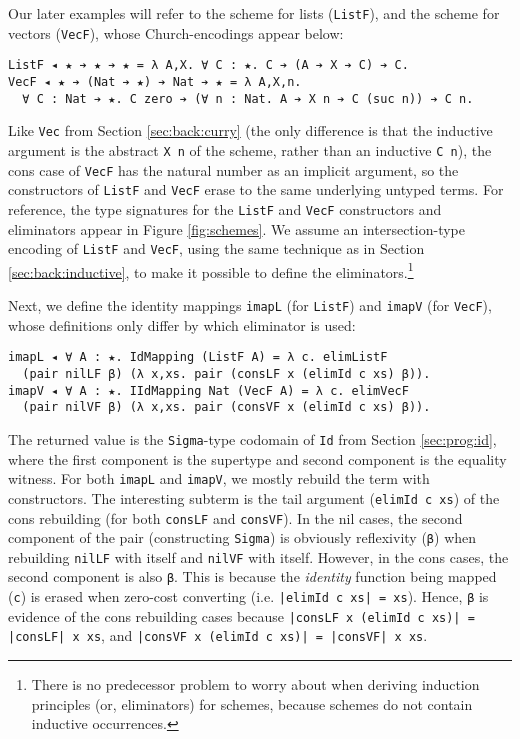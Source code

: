 \documentclass[acmsmall,screen]{acmart}
\newcommand{\refsec}[1]{Section \ref{sec:#1}}
\newcommand{\reffig}[1]{Figure \ref{fig:#1}}
\begin{document}
Our later examples will refer to the scheme for lists (\verb;ListF;),
and the scheme for vectors (\verb;VecF;), whose Church-encodings
appear below:
\begin{verbatim}
ListF ◂ ★ ➔ ★ ➔ ★ = λ A,X. ∀ C : ★. C ➔ (A ➔ X ➔ C) ➔ C.
VecF ◂ ★ ➔ (Nat ➔ ★) ➔ Nat ➔ ★ = λ A,X,n. 
  ∀ C : Nat ➔ ★. C zero ➔ (∀ n : Nat. A ➔ X n ➔ C (suc n)) ➔ C n.
\end{verbatim}
Like \verb;Vec; from \refsec{back:curry}
(the only difference is that the inductive argument is the abstract \verb;X n; of
the scheme, rather than an inductive \verb;C n;), the cons case of
\verb;VecF; has the natural number as an implicit argument, so the
constructors of \verb;ListF; and \verb;VecF; erase to the same
underlying untyped terms. For reference, the type signatures for the
\verb;ListF; and \verb;VecF; constructors and eliminators appear in
\reffig{schemes}. We assume an intersection-type encoding of
\verb;ListF; and \verb;VecF;, using the same technique as in
\refsec{back:inductive}, to make it possible to define the
eliminators.\footnote{
  There is no predecessor problem to worry about when deriving
  induction principles (or, eliminators) for schemes, because schemes
  do not contain inductive occurrences.
}

Next, we define the identity mappings \verb;imapL; (for \verb;ListF;)
and \verb;imapV; (for \verb;VecF;), whose definitions only differ by
which eliminator is used:
\begin{verbatim}
imapL ◂ ∀ A : ★. IdMapping (ListF A) = λ c. elimListF
  (pair nilLF β) (λ x,xs. pair (consLF x (elimId c xs) β)).
imapV ◂ ∀ A : ★. IIdMapping Nat (VecF A) = λ c. elimVecF
  (pair nilVF β) (λ x,xs. pair (consVF x (elimId c xs) β)).
\end{verbatim}
The returned value is the \verb;Sigma;-type codomain of \verb;Id; from
\refsec{prog:id}, where the first component is the supertype and
second component is the equality witness. For both \verb;imapL; and
\verb;imapV;, we mostly rebuild the term with constructors. The
interesting subterm is the tail argument (\verb;elimId c xs;) of the
cons rebuilding (for both \verb;consLF; and \verb;consVF;).
In the nil cases, the second component of the pair (constructing
\verb;Sigma;) is obviously reflexivity (\verb;β;) when rebuilding
\verb;nilLF; with itself and \verb;nilVF; with itself. However, in the
cons cases, the second component is also \verb;β;. This is because the
\textit{identity} function being mapped (\verb;c;) is erased when
zero-cost converting (i.e. \verb;|elimId c xs| = xs;).
Hence, \verb;β; is evidence of the
cons rebuilding cases because \verb;|consLF x (elimId c xs)| = |consLF| x xs;,
and \verb;|consVF x (elimId c xs)| = |consVF| x xs;.
\end{document}
